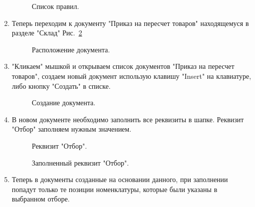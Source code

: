 \begin{enumerate}
	\begin{figure}[H]
		\caption{Список правил.}
		\label{ris:0_13.jpg}
	\end{figure}
	\item Теперь переходим к документу "Приказ на пересчет товаров" находящемуся в разделе "Склад" Рис.~\ref{ris:0_1.jpg}
	\begin{figure}[h!]
		\caption{Расположение документа.}
		\label{ris:0_1.jpg}
	\end{figure}
	\item "Кликаем" мышкой и открываем список документов "Приказ на пересчет товаров", создаем новый документ использую клавишу "Insert" на клавиатуре, либо кнопку "Создать" в списке.
\begin{figure}[H]
	\caption{Создание документа.}
	\label{ris:0_17.jpg}
\end{figure}
	\item В новом документе необходимо заполнить все реквизиты в шапке. 
	Реквизит "Отбор" заполняем нужным значением. 
	\begin{figure}[H]
		\caption{Реквизит "Отбор".}
		\label{ris:0_14.jpg}
	\end{figure}
	\begin{figure}[H]
		\caption{Заполненный реквизит "Отбор".}
		\label{ris:0_16.jpg}
	\end{figure}	
	\item Теперь в документы созданные на основании данного, при заполнении попадут только те позиции номенклатуры, которые были указаны в выбранном отборе.
	\end{enumerate}

